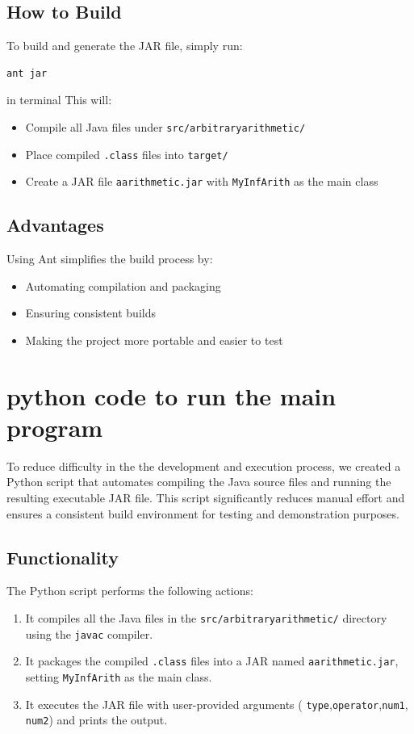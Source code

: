 \documentclass{article}
\begin{document}
\subsection*{How to Build}
To build and generate the JAR file, simply run:
\begin{verbatim}
ant jar
\end{verbatim}
in terminal This will:
\begin{itemize}
    \item Compile all Java files under \texttt{src/arbitraryarithmetic/}
    \item Place compiled \texttt{.class} files into \texttt{target/}
    \item Create a JAR file \texttt{aarithmetic.jar} with \texttt{MyInfArith} as the main class
\end{itemize}
\subsection*{Advantages}
Using Ant simplifies the build process by:
\begin{itemize}
    \item Automating compilation and packaging
    \item Ensuring consistent builds
    \item Making the project more portable and easier to test
\end{itemize}

\section*{python code to run the main program}
To reduce difficulty in the the development and execution process, we created a Python script that automates compiling the Java source files and running the resulting executable JAR file. This script significantly reduces manual effort and ensures a consistent build environment for testing and demonstration purposes.
\subsection*{Functionality}
The Python script performs the following actions:
\begin{enumerate}
    \item It compiles all the Java files in the \texttt{src/arbitraryarithmetic/} directory using the \texttt{javac} compiler.
    \item It packages the compiled \texttt{.class} files into a JAR named \texttt{aarithmetic.jar}, setting \texttt{MyInfArith} as the main class.
    \item It executes the JAR file with user-provided arguments (  \texttt{type},\texttt{operator},\texttt{num1}, \texttt{num2}) and prints the output.
\end{enumerate}
\end{document}
